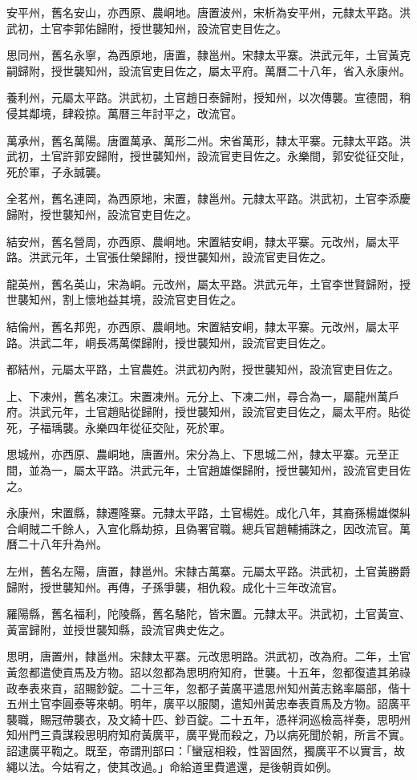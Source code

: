 \begin{pinyinscope}
安平州，舊名安山，亦西原、農峒地。唐置波州，宋析為安平州，元隸太平路。洪武初，土官李郭佑歸附，授世襲知州，設流官吏目佐之。

思同州，舊名永寧，為西原地，唐置，隸邕州。宋隸太平寨。洪武元年，土官黃克嗣歸附，授世襲知州，設流官吏目佐之，屬太平府。萬曆二十八年，省入永康州。

養利州，元屬太平路。洪武初，土官趙日泰歸附，授知州，以次傳襲。宣德間，稍侵其鄰境，肆殺掠。萬曆三年討平之，改流官。

萬承州，舊名萬陽。唐置萬承、萬形二州。宋省萬形，隸太平寨。元隸太平路。洪武初，土官許郭安歸附，授世襲知州，設流官吏目佐之。永樂間，郭安從征交阯，死於軍，子永誠襲。

全茗州，舊名連岡，為西原地，宋置，隸邕州。元隸太平路。洪武初，土官李添慶歸附，授世襲知州，設流官吏目佐之。

結安州，舊名營周，亦西原、農峒地。宋置結安峒，隸太平寨。元改州，屬太平路。洪武元年，土官張仕榮歸附，授世襲知州，設流官吏目佐之。

龍英州，舊名英山，宋為峒。元改州，屬太平路。洪武元年，土官李世賢歸附，授世襲知州，割上懷地益其境，設流官吏目佐之。

結倫州，舊名邦兜，亦西原、農峒地。宋置結安峒，隸太平寨。元改州，屬太平路。洪武二年，峒長馮萬傑歸附，授世襲知州，設流官吏目佐之。

都結州，元屬太平路，土官農姓。洪武初內附，授世襲知州，設流官吏目佐之。

上、下凍州，舊名凍江。宋置凍州。元分上、下凍二州，尋合為一，屬龍州萬戶府。洪武元年，土官趙貼從歸附，授世襲知州，設流官吏目佐之，屬太平府。貼從死，子福瑀襲。永樂四年從征交阯，死於軍。

思城州，亦西原、農峒地，唐置州。宋分為上、下思城二州，隸太平寨。元至正間，並為一，屬太平路。洪武元年，土官趙雄傑歸附，授世襲知州，設流官吏目佐之。

永康州，宋置縣，隸遷隆寨。元隸太平路，土官楊姓。成化八年，其裔孫楊雄傑糾合峒賊二千餘人，入宣化縣劫掠，且偽署官職。總兵官趙輔捕誅之，因改流官。萬曆二十八年升為州。

左州，舊名左陽，唐置，隸邕州。宋隸古萬寨。元屬太平路。洪武初，土官黃勝爵歸附，授世襲知州。再傳，子孫爭襲，相仇殺。成化十三年改流官。

羅陽縣，舊名福利，陀陵縣，舊名駱陀，皆宋置。元隸太平。洪武初，土官黃宣、黃富歸附，並授世襲知縣，設流官典史佐之。

思明，唐置州，隸邕州。宋隸太平寨。元改思明路。洪武初，改為府。二年，土官黃忽都遣使貢馬及方物。詔以忽都為思明府知府，世襲。十五年，忽都復遣其弟祿政奉表來貢，詔賜鈔錠。二十三年，忽都子黃廣平遣思州知州黃志銘率屬部，偕十五州土官李圓泰等來朝。明年，廣平以服闋，遣知州黃忠奉表貢馬及方物。詔廣平襲職，賜冠帶襲衣，及文綺十匹、鈔百錠。二十五年，憑祥洞巡檢高祥奏，思明州知州門三貴謀殺思明府知府黃廣平，廣平覺而殺之，乃以病死聞於朝，所言不實。詔逮廣平鞫之。既至，帝謂刑部曰：「蠻寇相殺，性習固然，獨廣平不以實言，故繩以法。今姑宥之，使其改過。」命給道里費遣還，是後朝貢如例。


\end{pinyinscope}
